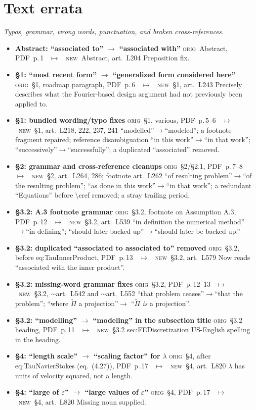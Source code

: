 \documentclass[11pt]{article}
\newcommand{\Orig}{\textcolor{origc}{\footnotesize\textsc{orig}}}
\newcommand{\New}{\textcolor{newc}{\footnotesize\textsc{new}}}
\newcommand{\code}[1]{\textcolor{newc}{\ttfamily\small #1}}
\newcommand{\pdfp}[1]{PDF~p.\,#1}
\newcommand{\artl}[1]{art.\ L#1}       %
\newcommand{\ch}[4]{%
  \item \textbf{#1}\newline
    {\footnotesize\Orig\ #2 \ \textcolor{locc}{$\longmapsto$} \ \New\ #3}\newline
    #4}
\begin{document}
\section{Text errata}
\emph{Typos, grammar, wrong words, punctuation, and broken cross-references.}

\begin{itemize}
\ch{Abstract: ``associated to'' $\to$ ``associated with''}
   {Abstract, \pdfp{1}}{Abstract, \artl{204}}{Preposition fix.}
\ch{\S1: ``most recent form'' $\to$ ``generalized form considered here''}
   {\S1, roadmap paragraph, \pdfp{6}}{\S1, \artl{243}}
   {Precisely describes what the Fourier-based design argument had not previously been applied to.}
\ch{\S1: bundled wording/typo fixes}
   {\S1, various, \pdfp{5}--6}{\S1, \artl{218}, 222, 237, 241}
   {``modelled''$\to$``modeled''; a footnote fragment repaired; reference disambiguation
    ``in this work''$\to$``in that work''; ``successively''$\to$``successfully''; a duplicated
    ``associated'' removed.}
\ch{\S2: grammar and cross-reference cleanups}
   {\S2/\S2.1, \pdfp{7}--8}{\S2, \artl{264}, 286; footnote \artl{262}}
   {``of resulting problem''$\to$``of the resulting problem''; ``as done in this work''$\to$``in that
    work''; a redundant ``Equations'' before \code{\textbackslash cref} removed; a stray trailing
    period.}
\ch{\S3.2: A.3 footnote grammar}
   {\S3.2, footnote on Assumption A.3, \pdfp{12}}{\S3.2, \artl{539}}
   {``in definition the numerical method''$\to$``in defining''; ``should later backed up''$\to$``should
    later be backed up.''}
\ch{\S3.2: duplicated ``associated to associated to'' removed}
   {\S3.2, before \code{eq:TauInnerProduct}, \pdfp{13}}{\S3.2, \artl{579}}
   {Now reads ``associated with the inner product''.}
\ch{\S3.2: missing-word grammar fixes}
   {\S3.2, \pdfp{12}--13}{\S3.2, $\sim$\artl{542} and $\sim$\artl{552}}
   {``that problem ceases''$\to$``that the problem''; ``where $\widetilde\Pi$ a projection''$\to$
    ``$\widetilde\Pi$ \emph{is} a projection''.}
\ch{\S3.2: ``modelling'' $\to$ ``modeling'' in the subsection title}
   {\S3.2 heading, \pdfp{11}}{\S3.2 \code{sec:FEDiscretization}}
   {US-English spelling in the heading.}
\ch{\S4: ``length scale'' $\to$ ``scaling factor'' for $\lambda$}
   {\S4, after \code{eq:TauNavierStokes} (eq.~(4.27)), \pdfp{17}}{\S4, \artl{820}}
   {$\lambda$ has units of velocity squared, not a length.}
\ch{\S4: ``large of $\varepsilon$'' $\to$ ``large values of $\varepsilon$''}
   {\S4, \pdfp{17}}{\S4, \artl{820}}{Missing noun supplied.}

\end{itemize}
\end{document}

